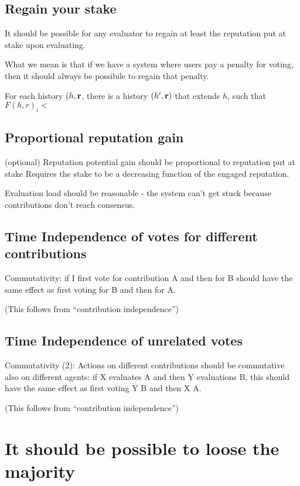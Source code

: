 \documentclass{article}
\begin{document}
\subsection{Regain your stake}
It should be possible for any evaluator to regain at least the reputation put at stake upon evaluating.

What we mean is that if we have a system where users pay a penalty for voting, then it should always be possibile to regain that penalty. 
\begin{center}
For each history $(h, {\bf r}$, there is a history $(h', {\bf r})$ that extends $h$, such that $F(h,r)_i < $ 
\end{center}


\subsection{Proportional reputation gain}
(optional) Reputation potential gain should be proportional to reputation put at stake
Requires the stake to be a decreasing function of the engaged reputation.

Evaluation load should be reasonable - the system can’t get stuck because contributions don’t reach consensus.

\subsection{Time Independence of votes for different contributions}


Commutativity: if I first vote for contribution A and then for B should have the same effect as first voting for B and then for A.

(This follows from ``contribution independence'')

\subsection{Time Independence of unrelated votes}


Commutativity (2): Actions on different contributions should be commutative also on different agents: if X evaluates A and then Y evaluations B, this should have the same effect as first voting Y B and then X A.

(This follows from ``contribution independence'')

\section{It should be possible to loose the majority}
\end{document}
